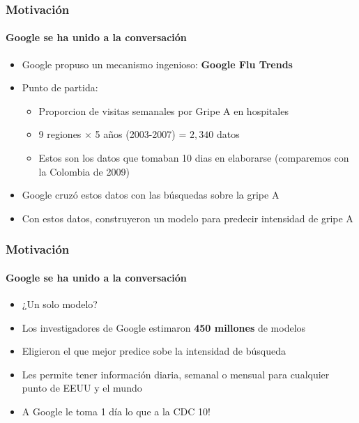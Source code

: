 \documentclass[
  shownotes,
  xcolor={svgnames},
  hyperref={colorlinks,citecolor=DarkBlue,linkcolor=DarkRed,urlcolor=DarkBlue}
  , aspectratio=169]{beamer}
\begin{document}

\begin{frame}
\frametitle{Motivación}
\framesubtitle{Google se ha unido a la conversación}

\begin{itemize}
  \item Google propuso un mecanismo ingenioso: {\bf Google Flu Trends}
  \bigskip
  \item Punto de partida: 
  \begin{itemize}
    \item Proporcion de visitas semanales por Gripe A en hospitales 
    \item 9 regiones $\times$ 5 años (2003-2007) = $2,340$ datos
    \item Estos son los datos que tomaban 10 dias en elaborarse (comparemos con la Colombia de 2009)
  \end{itemize}
  \bigskip
  \item Google cruzó estos datos con las búsquedas sobre la gripe A
  \bigskip
  \item Con estos datos, construyeron un modelo para predecir intensidad de gripe A  
\end{itemize}  

\end{frame}


\begin{frame}
\frametitle{Motivación}
\framesubtitle{Google se ha unido a la conversación}

\begin{itemize}
  \item ¿Un solo modelo?
  \bigskip
  \item Los investigadores de Google estimaron {\bf 450 millones} de modelos
  \bigskip
  \item Eligieron el que mejor predice sobe la intensidad de búsqueda
  \bigskip
  \item Les permite tener información diaria, semanal o mensual para cualquier punto de EEUU y el mundo
  \bigskip
  \item A Google le toma 1 día lo que a la CDC 10!
\end{itemize}  
\end{frame}



\end{document}
